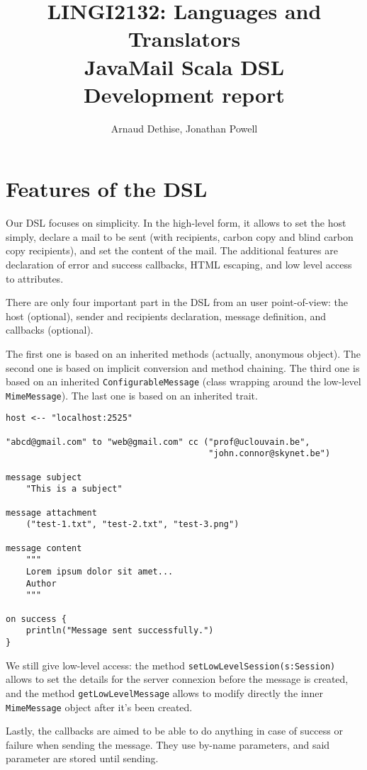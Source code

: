 \documentclass[10pt,a4paper]{article}
\author{Arnaud Dethise, Jonathan Powell}
\title{LINGI2132: Languages and Translators\\
	JavaMail Scala DSL\\
	Development report}
\begin{document}
	
\maketitle

\section{Features of the DSL}

	Our DSL focuses on simplicity. In the high-level form, it allows to set the host simply, declare a mail to be sent (with recipients, carbon copy and blind carbon copy recipients), and set the content of the mail. The additional features are declaration of error and success callbacks, HTML escaping, and low level access to attributes.
	
	\vskip 10pt
	There are only four important part in the DSL from an user point-of-view: the host (optional), sender and recipients declaration, message definition, and callbacks (optional).
	
	The first one is based on an inherited methods (actually, anonymous object). The second one is based on implicit conversion and method chaining. The third one is based on an inherited \texttt{ConfigurableMessage} (class wrapping around the low-level \texttt{MimeMessage}). The last one is based on an inherited trait.
	
	\vskip 10pt
	\begin{lstlisting}
host <-- "localhost:2525"

"abcd@gmail.com" to "web@gmail.com" cc ("prof@uclouvain.be", 
                                        "john.connor@skynet.be")

message subject
    "This is a subject"

message attachment
    ("test-1.txt", "test-2.txt", "test-3.png")
	
message content
    """
    Lorem ipsum dolor sit amet...
    Author
    """
    
on success {
    println("Message sent successfully.")
}
	\end{lstlisting}
	
	\vskip 10pt
	We still give low-level access: the method \texttt{setLowLevelSession(s:Session)} allows to set the details for the server connexion before the message is created, and the method \texttt{getLowLevelMessage} allows to modify directly the inner \texttt{MimeMessage} object after it's been created.
	
	\vskip 10pt
	Lastly, the callbacks are aimed to be able to do anything in case of success or failure when sending the message. They use by-name parameters, and said parameter are stored until sending.	
	
\end{document}
